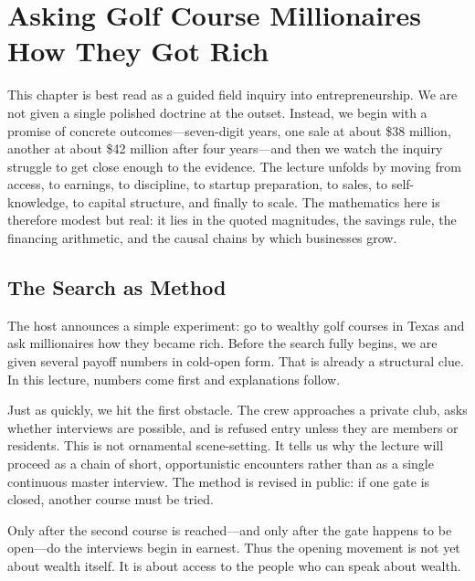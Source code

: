\chapter{Asking Golf Course Millionaires How They Got Rich}

This chapter is best read as a guided field inquiry into entrepreneurship. We are not given a single polished doctrine at the outset. Instead, we begin with a promise of concrete outcomes---seven-digit years, one sale at about \$38 million, another at about \$42 million after four years---and then we watch the inquiry struggle to get close enough to the evidence. The lecture unfolds by moving from access, to earnings, to discipline, to startup preparation, to sales, to self-knowledge, to capital structure, and finally to scale. The mathematics here is therefore modest but real: it lies in the quoted magnitudes, the savings rule, the financing arithmetic, and the causal chains by which businesses grow.

\section{The Search as Method}

The host announces a simple experiment: go to wealthy golf courses in Texas and ask millionaires how they became rich. Before the search fully begins, we are given several payoff numbers in cold-open form. That is already a structural clue. In this lecture, numbers come first and explanations follow.

Just as quickly, we hit the first obstacle. The crew approaches a private club, asks whether interviews are possible, and is refused entry unless they are members or residents. This is not ornamental scene-setting. It tells us why the lecture will proceed as a chain of short, opportunistic encounters rather than as a single continuous master interview. The method is revised in public: if one gate is closed, another course must be tried.

Only after the second course is reached---and only after the gate happens to be open---do the interviews begin in earnest. Thus the opening movement is not yet about wealth itself. It is about access to the people who can speak about wealth.

